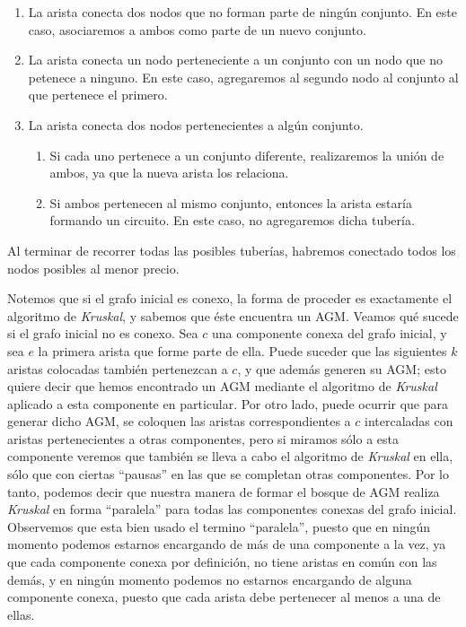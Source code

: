 \begin{enumerate}
	\item La arista conecta dos nodos que no forman parte de ningún conjunto.  En este caso, asociaremos a ambos como parte de un nuevo conjunto.
	\item La arista conecta un nodo perteneciente a un conjunto con un nodo que no petenece a ninguno.  En este caso, agregaremos al segundo nodo al conjunto al que pertenece el primero.
	\item La arista conecta dos nodos pertenecientes a algún conjunto.
	
	\begin{enumerate}
		\item Si cada uno pertenece a un conjunto diferente, realizaremos la unión de ambos, ya que la nueva arista los relaciona.
		\item Si ambos pertenecen al mismo conjunto, entonces la arista estaría formando un circuito.  En este caso, no agregaremos dicha tubería.
	\end{enumerate}
\end{enumerate}

Al terminar de recorrer todas las posibles tuberías, habremos conectado todos los nodos posibles al menor precio.

Notemos que si el grafo inicial es conexo, la forma de proceder es exactamente el algoritmo de {\it Kruskal}, y sabemos que éste encuentra un AGM.  Veamos qué sucede si el grafo inicial no es conexo.  Sea $c$ una componente conexa del grafo inicial, y sea $e$ la primera arista que forme parte de ella.  Puede suceder que las siguientes $k$ aristas colocadas también pertenezcan a $c$, y que además generen su AGM; esto quiere decir que hemos encontrado un AGM mediante el algoritmo de {\it Kruskal} aplicado a esta componente en particular.  Por otro lado, puede ocurrir que para generar dicho AGM, se coloquen las aristas correspondientes a $c$ intercaladas con aristas pertenecientes a otras componentes, pero si miramos sólo a esta componente veremos que también se lleva a cabo el algoritmo de {\it Kruskal} en ella, sólo que con ciertas ``pausas'' en las que se completan otras componentes.  Por lo tanto, podemos decir que nuestra manera de formar el bosque de AGM realiza {\it Kruskal} en forma ``paralela'' para todas las componentes conexas del grafo inicial. Observemos que esta bien usado el termino ``paralela'', puesto que en ningún momento podemos estarnos encargando de más de una componente a la vez, ya que cada componente conexa por definición, no tiene aristas en común con las demás, y en ningún momento podemos no estarnos encargando de alguna componente conexa, puesto que cada arista debe pertenecer al menos a una de ellas.

